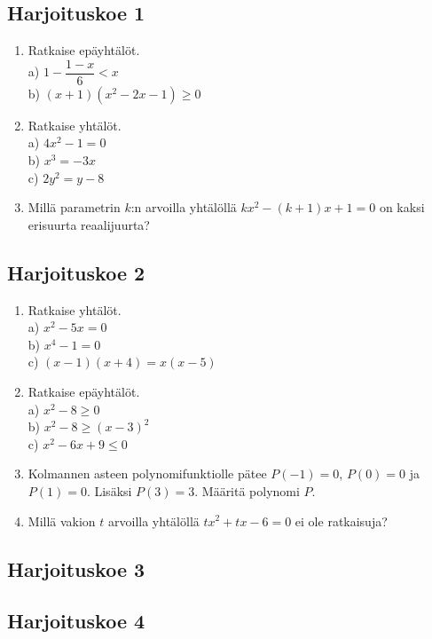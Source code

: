 
\subsection*{Harjoituskoe 1}

\begin{enumerate}
\item Ratkaise epäyhtälöt.\\ a) $1-\dfrac{1-x}{6}<x$\\ b) $(x+1)(x^2-2x-1)\geq0$
\item Ratkaise yhtälöt.\\ a) $4x^2-1=0$\\ b) $x^3=-3x$\\ c) $2y^2=y-8$
\item Millä parametrin $k$:n arvoilla yhtälöllä $kx^2-(k+1)x+1=0$ on kaksi erisuurta reaalijuurta? 

\end{enumerate}

\subsection*{Harjoituskoe 2}

\begin{enumerate}
\item Ratkaise yhtälöt.\\ a) $x^2-5x=0$\\ b) $x^4-1=0$\\ c) $(x-1)(x+4) = x(x-5)$
\item Ratkaise epäyhtälöt.\\ a) $x^2-8\geq0$\\ b) $x^2-8\geq(x-3)^2$\\ c) $x^2-6x+9\leq0$
\item Kolmannen asteen polynomifunktiolle pätee $P(-1)=0$, $P(0)=0$ ja $P(1)=0$. Lisäksi $P(3)=3$. Määritä polynomi $P$.
\item Millä vakion $t$ arvoilla yhtälöllä $tx^2+tx-6=0$ ei ole ratkaisuja?
\end{enumerate}


\subsection*{Harjoituskoe 3}


\subsection*{Harjoituskoe 4}
